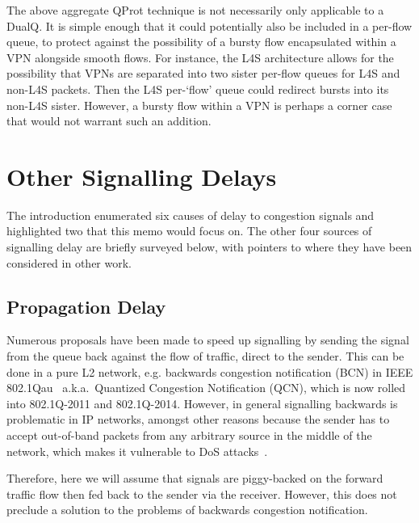 The above aggregate QProt technique is not necessarily only applicable to a DualQ. It is simple enough that it could potentially also be included in a per-flow queue, to protect against the possibility of a bursty flow encapsulated within a VPN alongside smooth flows. For instance, the L4S architecture allows for the possibility that VPNs are separated into two sister per-flow queues for L4S and non-L4S packets. Then the L4S per-`flow' queue could redirect bursts into its non-L4S sister. However, a bursty flow within a VPN is perhaps a corner case that would not warrant such an addition.

\section{Other Signalling Delays}\label{sec:other_delays}

The introduction enumerated six causes of delay to congestion signals and highlighted two that this memo would focus on. The other four sources of signalling delay are briefly surveyed below, with pointers to where they have been considered in other work.

\subsection{Propagation Delay} Numerous proposals have been made to speed up signalling by sending the signal from the queue back against the flow of traffic, direct to the sender. This can be done in a pure L2 network, e.g. backwards congestion notification (BCN) in IEEE 802.1Qau~\cite{IEEE802.1Qau:Ethernet_QCN} a.k.a.\ Quantized Congestion Notification (QCN), which is now rolled into 802.1Q-2011 and 802.1Q-2014. However, in general signalling backwards is problematic in IP networks, amongst other reasons because the sender has to accept out-of-band packets from any arbitrary source in the middle of the network, which makes it vulnerable to DoS attacks~\cite{IETF_RFC6633:ICMP_SQ_Depr}. 

Therefore, here we will assume that signals are piggy-backed on the forward traffic flow then fed back to the sender via the receiver. However, this does not preclude a solution to the problems of backwards congestion notification.

